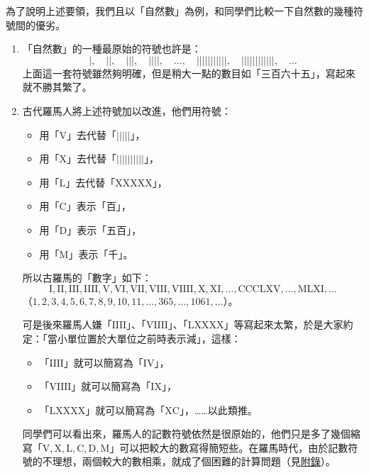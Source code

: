 \begin{example}\label{ex:2-2-2}
為了說明上述要領，我們且以「自然數」為例，和同學們比較一下自然數的幾種符號間的優劣。

\begin{enumerate}[(1)]
  \item 「自然數」的一種最原始的符號也許是：
  \begin{equation*}
    |, \quad ||, \quad |||, \quad ||||, \quad \dots, \quad |||||||||||, \quad ||||||||||||, \quad \dots
  \end{equation*}
  上面這一套符號雖然夠明確，但是稍大一點的數目如「三百六十五」，寫起來就不勝其繁了。

  \item 古代羅馬人將上述符號加以改進，他們用符號：
  \begin{itemize}
    \item 用「$\mathrm{V}$」去代替「$|||||$」，
    \item 用「$\mathrm{X}$」去代替「$||||||||||$」，
    \item 用「$\mathrm{L}$」去代替「$\mathrm{XXXXX}$」，
    \item 用「$\mathrm{C}$」表示「百」，
    \item 用「$\mathrm{D}$」表示「五百」，
    \item 用「$\mathrm{M}$」表示「千」。
  \end{itemize}
  所以古羅馬的「數字」如下：
  \begin{equation*}
    \mathrm{I, II, III, IIII, V, VI, VII, VIII, VIIII, X, XI, \dots, CCCLXV, \dots, MLXI, \dots}
  \end{equation*}
  （$1, 2, 3, 4, 5, 6, 7, 8, 9, 10, 11, \dots, 365, \dots, 1061, \dots$）。

  可是後來羅馬人嫌「$\mathrm{IIII}$」、「$\mathrm{VIIII}$」、「$\mathrm{LXXXX}$」等寫起來太繁，於是大家約定：「當小單位置於大單位之前時表示減」，這樣：
  \begin{itemize}
    \item 「$\mathrm{IIII}$」就可以簡寫為「$\mathrm{IV}$」，
    \item 「$\mathrm{VIIII}$」就可以簡寫為「$\mathrm{IX}$」，
    \item 「$\mathrm{LXXXX}$」就可以簡寫為「$\mathrm{XC}$」，……以此類推。
  \end{itemize}
  同學們可以看出來，羅馬人的記數符號依然是很原始的，他們只是多了幾個縮寫「$\mathrm{V, X, L, C, D, M}$」可以把較大的數寫得簡短些。在羅馬時代，由於記數符號的不理想，兩個較大的數相乘，就成了個困難的計算問題（見\hyperref[sec:ch2-appendix]{附錄}）。


\end{enumerate}
\end{example}

